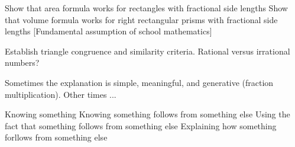Show that area formula works for rectangles with fractional side lengths
Show that volume formula works for right rectangular prisms with fractional side lengths
[Fundamental assumption of school mathematics]

Establish triangle congruence and similarity criteria.  
Rational versus irrational numbers? 


Sometimes the explanation is simple, meaningful, and generative (fraction multiplication).
Other times ... 

Knowing something
Knowing something follows from something else
Using the fact that something follows from something else
Explaining how something forllows from something else


